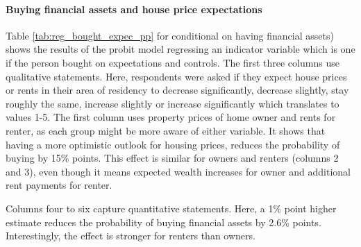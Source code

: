 \documentclass[ProjectABM]{subfiles}
\begin{document}
%



\paragraph{Buying financial assets and house price expectations}
Table \ref{tab:reg_bought_expec_pp} for conditional on having financial assets) shows the results of the probit model regressing an indicator variable which is one if the person bought on expectations and controls. The first three columns use qualitative statements. Here, respondents were asked if they expect house prices or rents in their area of residency to decrease significantly, decrease slightly, stay roughly the same, increase slightly or increase significantly which translates to values 1-5. The first column uses property prices of home owner and rents for renter, as each group might be more aware of either variable. It shows that having a more optimistic outlook for housing prices, reduces the probability of buying by 15\% points. This effect is similar for owners and renters (columns 2 and 3), even though it means expected wealth increases for owner and additional rent payments for renter.%

Columns four to six capture quantitative statements. Here, a 1\% point higher estimate reduces the probability of buying financial assets by 2.6\% points. Interestingly, the effect is stronger for renters than owners.



\end{document}
